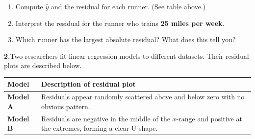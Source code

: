\documentclass[10pt]{article}
\begin{document}
\begin{enumerate}[label=\textbf{(\alph*)}, leftmargin=2em, itemsep=0.18in]

  \item Compute $\hat{y}$ and the residual for each runner. (See table above.)\\

  \item Interpret the residual for the runner who trains \textbf{25 miles per week}.\\[8pt]

  \item Which runner has the largest absolute residual? What does this tell you?\\[8pt]

\end{enumerate}

\vspace{0.18in}

\noindent\textbf{2.}\enspace Two researchers fit linear regression models to different datasets.
Their residual plots are described below.

\vspace{8pt}
\begin{tabularx}{\linewidth}{@{} >{\bfseries}p{2.2cm} X @{}}
\rowcolor{sky} \textbf{Model} & \textbf{Description of residual plot} \\
\midrule
Model A & Residuals appear randomly scattered above and below zero with no obvious pattern. \\[4pt]
Model B & Residuals are negative in the middle of the $x$-range and positive at the extremes,
          forming a clear U-shape. \\
\end{tabularx}

\vspace{10pt}
\end{document}
